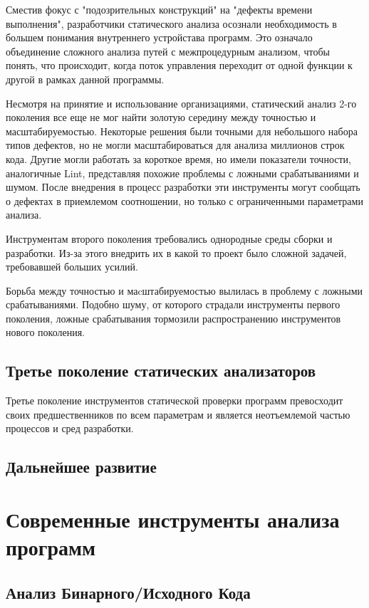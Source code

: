 Сместив фокус с "подозрительных конструкций" на "дефекты времени выполнения", разработчики 
статического анализа осознали необходимость в большем понимания внутреннего 
устройстава программ. Это означало объединение сложного анализа путей с межпроцедурным анализом, 
чтобы понять, что происходит, когда поток управления переходит от одной функции к другой в 
рамках данной программы.

Несмотря на принятие и использование организациями, статический анализ 2-го поколения все еще 
не мог найти золотую середину между точностью и масштабируемостью. Некоторые решения были 
точными для небольшого набора типов дефектов, но не могли масштабироваться для анализа 
миллионов строк кода. Другие могли работать за короткое время, но имели показатели точности, 
аналогичные Lint, представляя похожие проблемы с ложными срабатываниями и шумом. После 
внедрения в процесс разработки эти инструменты могут сообщать о дефектах в приемлемом 
соотношении, но только с ограниченными параметрами анализа. 

Инструментам второго поколения требовались однородные среды сборки и разработки. 
Из-за этого внедрить их в какой то проект было сложной задачей, требовавшей больших усилий.

Борьба между точностью и маcштабируемостью вылилась в проблему с ложными срабатываниями. Подобно 
шуму, от которого страдали инструменты первого поколения, ложные срабатывания тормозили 
распространению инструментов нового поколения. 

\subsection{Третье поколение статических анализаторов}
Третье поколение инструментов статической проверки программ превосходит своих предшественников по
всем параметрам и является неотъемлемой частью процессов и сред разработки.  

\subsection{Дальнейшее развитие}

\section{Современные инструменты анализа программ}

\subsection{Анализ Бинарного/Исходного Кода}

